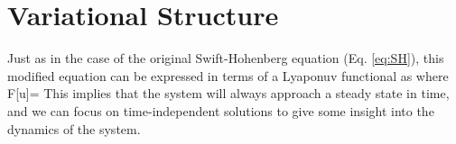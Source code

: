 \documentclass[../main/WavelengthCompetition.tex]{subfiles}
\begin{document}
\section{Variational Structure}
Just as in the case of the original Swift-Hohenberg equation (Eq. \ref{eq:SH}), this modified equation can be expressed in terms of a Lyaponuv functional as 
where
\beqn
F[u]=
\eeqn
This implies that the system will always approach a steady state in time, and we can focus on time-independent solutions to give some insight into the dynamics of the system.
\end{document}
